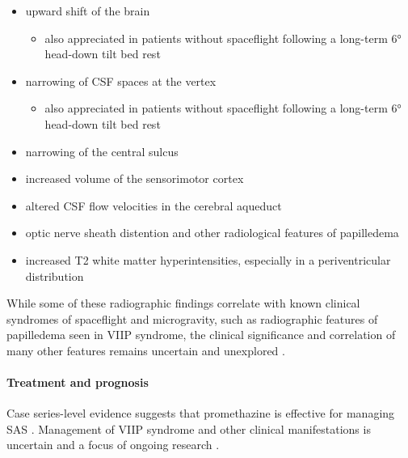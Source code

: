\begin{itemize}
	\tightlist
	\item
	upward shift of the brain 
	
	\begin{itemize}
		\tightlist
		\item
		also appreciated in patients without spaceflight following a long-term 6° head-down tilt bed rest 
	\end{itemize}
	\item
	narrowing of CSF spaces at the vertex 
	
	\begin{itemize}
		\tightlist
		\item
		also appreciated in patients without spaceflight following a long-term 6° head-down tilt bed rest 
	\end{itemize}
	\item
	narrowing of the central sulcus
	\item
	increased volume of the sensorimotor cortex 
	\item
	altered CSF flow velocities in the cerebral aqueduct 
	\item
	optic nerve sheath distention and other radiological features of papilledema
	\item
	increased T2 white matter hyperintensities, especially in a periventricular distribution 
\end{itemize}

While some of these radiographic findings correlate with known clinical syndromes of spaceflight and microgravity, such as radiographic features of papilledema seen in VIIP syndrome, the clinical significance and correlation of many other features remains uncertain and unexplored .

\paragraph{Treatment and prognosis}

Case series-level evidence suggests that promethazine is effective for managing SAS . Management of VIIP syndrome and other clinical manifestations is uncertain and a focus of ongoing research .